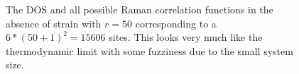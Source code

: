 \documentclass[reprint,amsmath,amssymb,aps,prl,groupedaddress,nofootinbib,superscriptaddress]{revtex4-1}
\newcommand{\1}{\mathds{1}}
\begin{document}
\begin{figure}
	\caption{The DOS and all possible Raman correlation functions in the absence of strain with $r=50$ corresponding to a $6*(50+1)^2 = 15606$ sites.  This looks very much like the thermodynamic limit with some fuzziness due to the small system size.} %
	\label{fig:stretch1}
\end{figure}
\end{document}
